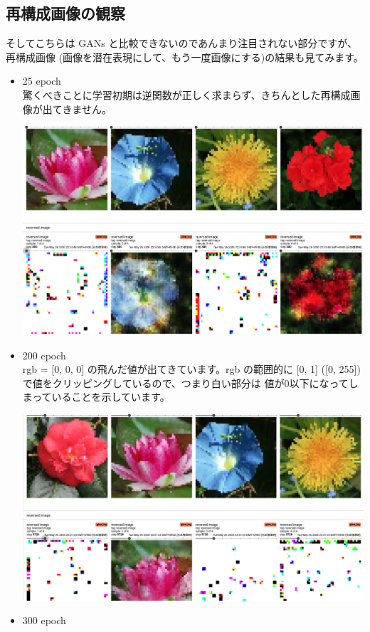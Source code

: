 \documentclass[dvipdfmx]{article}
\begin{document}
\subsection{再構成画像の観察}
\label{sec:orge3893d0}
そしてこちらは GANs と比較できないのであんまり注目されない部分ですが、再構成画像 (画像を潜在表現にして、もう一度画像にする)の結果も見てみます。\\

\begin{itemize}
\item 25 epoch\\
驚くべきことに学習初期は逆関数が正しく求まらず、きちんとした再構成画像が出てきません。\\
\begin{center}
\includegraphics[width=0.8\linewidth]{./re25epoch.png}
\end{center}
\item 200 epoch\\
rgb = [0, 0, 0] の飛んだ値が出てきています。rgb の範囲的に [0, 1] ([0, 255])で値をクリッピングしているので、つまり白い部分は 値が0以下になってしまっていることを示しています。\\
\begin{center}
\includegraphics[width=0.8\linewidth]{./re200epoch.png}
\end{center}
\item 300 epoch\\

\end{itemize}
\end{document}
